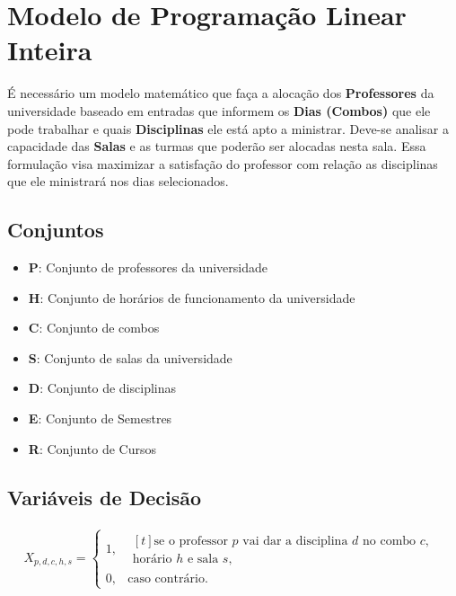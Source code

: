 \section{Modelo de Programação Linear Inteira}
\label{modelo-pli}


É necessário um modelo matemático que faça a alocação dos \textbf{Professores} da universidade baseado em entradas que informem os \textbf{Dias (Combos)} que ele pode trabalhar e quais \textbf{Disciplinas} ele está apto a ministrar. Deve-se analisar a capacidade das \textbf{Salas} e as turmas que poderão ser alocadas nesta sala. Essa formulação visa maximizar a satisfação do professor com relação as disciplinas que ele ministrará nos dias selecionados.

\subsection{Conjuntos} \label{conjuntos}
\begin{itemize}
 \item \textbf{P}: Conjunto de professores da universidade
 \item \textbf{H}: Conjunto de horários de funcionamento da universidade
 \item \textbf{C}: Conjunto de combos
 \item \textbf{S}: Conjunto de salas da universidade
 \item \textbf{D}: Conjunto de disciplinas
 \item \textbf{E}: Conjunto de Semestres
 \item \textbf{R}: Conjunto de Cursos
\end{itemize}

\subsection{Variáveis de Decisão} \label{variaveis}
\begin{align}
X_{p, d, c, h, s} = 
\begin{cases}
 1, & 
 \begin{multlined}[t]
	\text{se o professor $p$ vai dar a disciplina $d$ no combo $c$, } \\[-1.5ex] 
	\text{horário $h$ e sala $s$,}
 \end{multlined} \\
 0, & \text{caso contrário.}
\end{cases}
\end{align}
  
